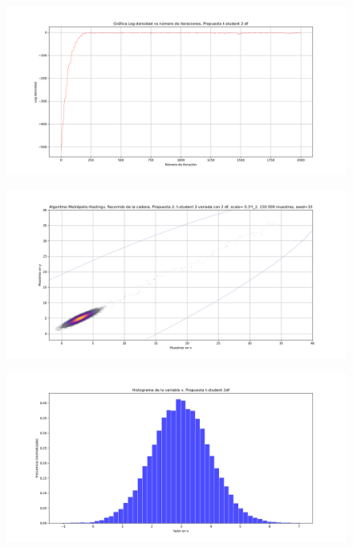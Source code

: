 \documentclass[letterpaper]{article}
\newcommand{\1}{\mathds{1}}
\theoremstyle{definition}
\theoremstyle{definition}
\theoremstyle{definition}
\theoremstyle{definition}
\theoremstyle{definition}
\begin{document}
    \begin{figure}[h!]
        \centering
        \includegraphics[width=\linewidth]{27.png}
        \caption{}
    \end{figure} 
    \begin{figure}[h!]
        \centering
        \includegraphics[width=\linewidth]{28.png}
        \caption{}
    \end{figure} 
    \begin{figure}[h!]
        \centering
        \includegraphics[width=\linewidth]{29.png}
        \caption{}
    \end{figure} 
\end{document}
